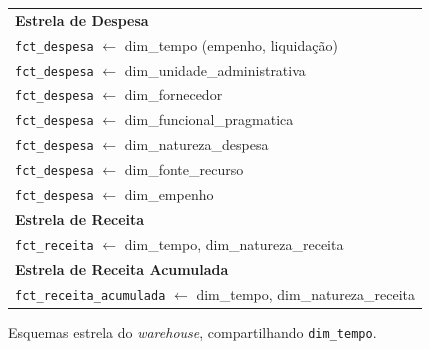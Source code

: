 \begin{figure}[ht]
\begin{center}
\begin{tabular}{|l|}
\hline
\textbf{Estrela de Despesa} \\
\texttt{fct\_despesa} $\leftarrow$ dim\_tempo (empenho, liquidação) \\
\texttt{fct\_despesa} $\leftarrow$ dim\_unidade\_administrativa \\
\texttt{fct\_despesa} $\leftarrow$ dim\_fornecedor \\
\texttt{fct\_despesa} $\leftarrow$ dim\_funcional\_pragmatica \\
\texttt{fct\_despesa} $\leftarrow$ dim\_natureza\_despesa \\
\texttt{fct\_despesa} $\leftarrow$ dim\_fonte\_recurso \\
\texttt{fct\_despesa} $\leftarrow$ dim\_empenho \\
\hline
\textbf{Estrela de Receita} \\
\texttt{fct\_receita} $\leftarrow$ dim\_tempo, dim\_natureza\_receita \\
\hline
\textbf{Estrela de Receita Acumulada} \\
\texttt{fct\_receita\_acumulada} $\leftarrow$ dim\_tempo, dim\_natureza\_receita \\
\hline
\end{tabular}
\caption{Esquemas estrela do \textit{warehouse}, compartilhando \texttt{dim\_tempo}.}
\label{fig:estrelas}
\end{center}
\end{figure}

